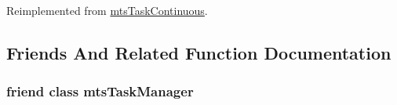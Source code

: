 Reimplemented from \hyperlink{classmts_task_continuous_ac227f446b1316fa938016d3190652f0d}{mts\-Task\-Continuous}.



\subsection{Friends And Related Function Documentation}
\hypertarget{classmts_task_periodic_a21d47396ed8d4c10b5acd6a083b219f9}{
\subsubsection[{mts\-Task\-Manager}]{\setlength{\rightskip}{0pt plus 5cm}friend class mts\-Task\-Manager\hspace{0.3cm}{\ttfamily [friend]}}}\label{classmts_task_periodic_a21d47396ed8d4c10b5acd6a083b219f9}


